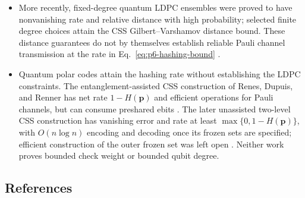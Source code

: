 \begin{itemize}
  \item More recently, fixed-degree quantum LDPC ensembles were proved to have
  nonvanishing rate and relative distance with high probability; selected
  finite degree choices attain the CSS Gilbert--Varshamov distance bound.
  These distance guarantees do not by themselves establish reliable Pauli
  channel transmission at the rate in Eq.~\eqref{eq:p6-hashing-bound}
  .

  \item Quantum polar codes attain the hashing rate without establishing the
  LDPC constraints.  The entanglement-assisted CSS construction of Renes,
  Dupuis, and Renner has net rate $1-H(\mathbf p)$ and efficient operations
  for Pauli channels, but can consume preshared ebits
  .  The later unassisted two-level CSS
  construction has vanishing error and rate at least
  $\max\{0,1-H(\mathbf p)\}$, with $O(n\log n)$ encoding and decoding once
  its frozen sets are specified; efficient construction of the outer frozen
  set was left open .  Neither work
  proves bounded check weight or bounded qubit degree.
\end{itemize}

\subsection*{References}

